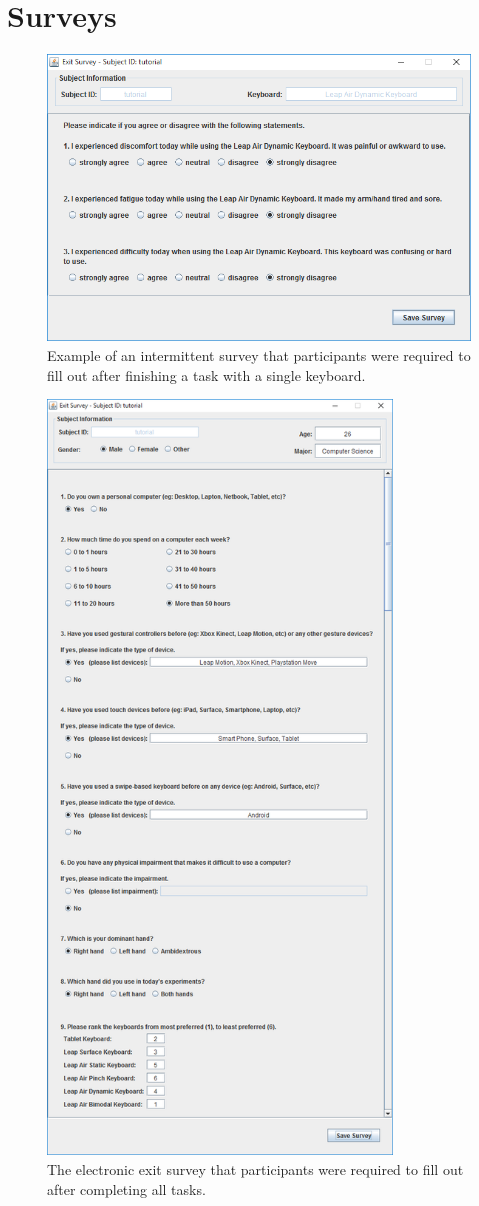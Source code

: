 \chapter{Surveys} \label{surveys}

\begin{figure}[h]
	\centering
	\includegraphics[width=5in]{Figures/fig_survey}
	\caption[Intermittent Survey]{Example of an intermittent survey that participants were required to fill out after finishing a task with a single keyboard.}
	\label{fig_survey}
\end{figure}

\begin{figure}[h]
	\centering
	\includegraphics[width=3.6in]{Figures/fig_exit_survey}
	\caption[Exit Survey]{The electronic exit survey that participants were required to fill out after completing all tasks.}
	\label{fig_exit_survey}
\end{figure}